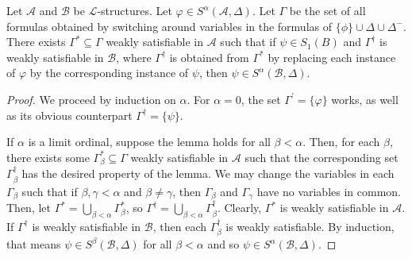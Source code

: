 \documentclass{article}
\let\mc\mathcal
\begin{document}
 \begin{lemma}\label{gStar}
     Let $\mc{A}$ and $\mc{B}$ be $\mc{L}$-structures. Let $\varphi \in S^{\alpha}(\mc{A}, \Delta)$. Let $\Gamma$ be the set of all formulas obtained by switching around variables in the formulas of $\{ \phi \} \cup \Delta \cup \Delta^{-}$. There exists $\Gamma^{\ast} \subseteq \Gamma$ weakly satisfiable in $\mc{A}$ such that if $\psi \in S_1(B)$ and $\Gamma^{\dagger}$ is weakly satisfiable in $\mc{B}$, where $\Gamma^{\dagger}$ is obtained from $\Gamma^{\ast}$ by replacing each instance of $\varphi$ by the corresponding instance of $\psi$, then $\psi \in S^{\alpha}(\mc{B}, \Delta)$.
\end{lemma}
\begin{proof}
    We proceed by induction on $\alpha$. For $\alpha = 0$, the set $\Gamma^{\prime} = \{ \varphi \}$ works, as well as its obvious counterpart $\Gamma^{\dagger} = \{ \psi \}$. 
    
    If $\alpha$ is a limit ordinal, suppose the lemma holds for all $\beta < \alpha$. Then, for each $\beta$, there exists some $\Gamma_{\beta}^{\ast} \subseteq \Gamma$ weakly satisfiable in $\mc{A}$ such that the corresponding set $\Gamma_{\beta}^{\dagger}$ has the desired property of the lemma. We may change the variables in each $\Gamma_{\beta}$ such that if $\beta, \gamma < \alpha$ and $\beta \neq \gamma$, then $\Gamma_{\beta}$ and $\Gamma_{\gamma}$ have no variables in common. Then, let $\Gamma^{\ast} = \bigcup_{\beta < \alpha} \Gamma_{\beta}^{\ast}$, so $\Gamma^{\dagger} = \bigcup_{\beta < \alpha} \Gamma_{\beta}^{\dagger}$. Clearly, $\Gamma^{\ast}$ is weakly satisfiable in $\mc{A}$. If $\Gamma^{\dagger}$ is weakly satisfiable in $\mc{B}$, then each $\Gamma_{\beta}^{\dagger}$ is weakly satisfiable. By induction, that means $\psi \in S^{\beta}(\mc{B}, \Delta)$ for all $\beta < \alpha$ and so $\psi \in S^{\alpha}(\mc{B}, \Delta)$.


\end{proof}
\end{document}
